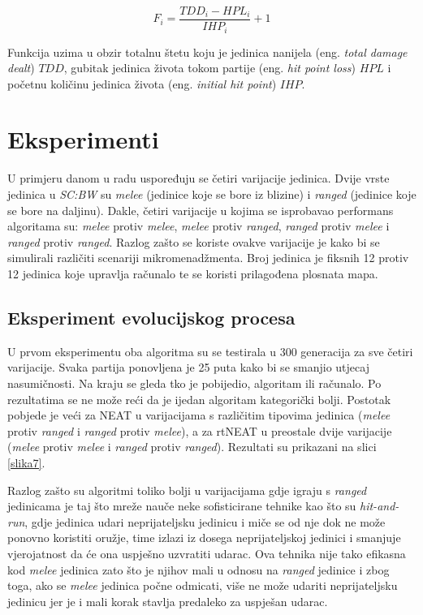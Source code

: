 \documentclass[times, utf8, seminar, numeric]{fer}
\begin{document}
\begin{equation}
F_i = \frac{TDD_i - HPL_i}{IHP_i} + 1
\label{jednakost6}
\end{equation}

Funkcija uzima u obzir totalnu štetu koju je jedinica nanijela (eng. \textit{total damage dealt}) $TDD$, gubitak jedinica života tokom partije (eng. \textit{hit point loss}) $HPL$ i početnu količinu jedinica života (eng. \textit{initial hit point}) $IHP$.

\section{Eksperimenti}
U primjeru danom u radu \citep{rad4} uspoređuju se četiri varijacije jedinica. Dvije vrste jedinica u \textit{SC:BW} su \textit{melee} (jedinice koje se bore iz blizine) i \textit{ranged} (jedinice koje se bore na daljinu). Dakle, četiri varijacije u kojima se isprobavao performans algoritama su: \textit{melee} protiv \textit{melee}, \textit{melee} protiv \textit{ranged}, \textit{ranged} protiv \textit{melee} i \textit{ranged} protiv \textit{ranged}. Razlog zašto se koriste ovakve varijacije je kako bi se simulirali različiti scenariji mikromenadžmenta. Broj jedinica je fiksnih 12 protiv 12 jedinica koje upravlja računalo te se koristi prilagođena plosnata mapa.

\subsection{Eksperiment evolucijskog procesa}
U prvom eksperimentu oba algoritma su se testirala u 300 generacija za sve četiri varijacije. Svaka partija ponovljena je 25 puta kako bi se smanjio utjecaj nasumičnosti. Na kraju se gleda tko je pobijedio, algoritam ili računalo. Po rezultatima se ne može reći da je ijedan algoritam kategorički bolji. Postotak pobjede je veći za NEAT u varijacijama s različitim tipovima jedinica (\textit{melee} protiv \textit{ranged} i \textit{ranged} protiv \textit{melee}), a za rtNEAT u preostale dvije varijacije (\textit{melee} protiv \textit{melee} i \textit{ranged} protiv \textit{ranged}). Rezultati su prikazani na slici \ref{slika7}.

Razlog zašto su algoritmi toliko bolji u varijacijama gdje igraju s \textit{ranged} jedinicama je taj što mreže nauče neke sofisticirane tehnike kao što su \textit{hit-and-run}, gdje jedinica udari neprijateljsku jedinicu i miče se od nje dok ne može ponovno koristiti oružje, time izlazi iz dosega neprijateljskoj jedinici i smanjuje vjerojatnost da će ona uspješno uzvratiti udarac. Ova tehnika nije tako efikasna kod \textit{melee} jedinica zato što je njihov mali u odnosu na \textit{ranged} jedinice i zbog toga, ako se \textit{melee} jedinica počne odmicati, više ne može udariti neprijateljsku jedinicu jer je i mali korak stavlja predaleko za uspješan udarac.
\end{document}
